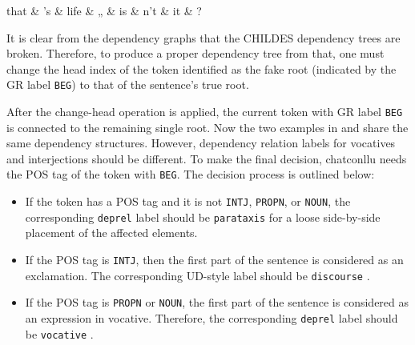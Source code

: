\begin{minipage}{\widefigurewidth}
\begin{dependency}[edge slant=3pt]
	\begin{deptext}[column sep=1cm]
	that \& 's \& life \& „ \& is \& n't \& it \& ?\\
	\end{deptext}
\end{dependency}
\end{minipage}
\label{fig:taggr}


It is clear from the dependency graphs that the CHILDES dependency trees are broken. Therefore, to produce a proper dependency tree from that, one must change the head index of the token identified as the fake root (indicated by the GR label \texttt{BEG}) to that of the sentence's true root.

After the change-head operation is applied, the current token with GR label \texttt{BEG} is connected to the remaining single root. Now the two examples in  and  share the same dependency structures. However, dependency relation labels for vocatives and interjections should be different. To make the final decision, chatconllu needs the POS tag of the token with \texttt{BEG}. The decision process is outlined below:\\

\begin{itemize}
	\item If the token has a POS tag and it is not \texttt{INTJ}, \texttt{PROPN}, or \texttt{NOUN}, the corresponding \texttt{deprel}  label should be \texttt{parataxis} for a loose side-by-side placement of the affected elements.
	\item If the POS tag is \texttt{INTJ}, then the first part of the sentence is considered as an exclamation. The corresponding UD-style label should be \texttt{discourse} .
	\item If the POS tag is \texttt{PROPN} or \texttt{NOUN}, the first part of the sentence is considered as an expression in vocative. Therefore, the corresponding \texttt{deprel} label should be \texttt{vocative} .
\end{itemize}

